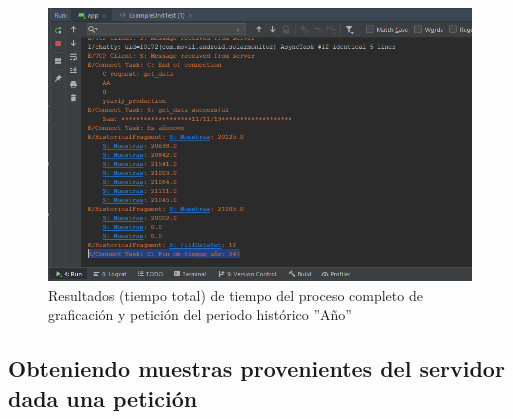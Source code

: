 \begin{figure}[H]
	\centering
	\includegraphics[scale=.6]{Capitulo5/images/TiempoCompletoAno2.png}
	\caption{Resultados (tiempo total) de tiempo del proceso completo de graficación y petición del periodo histórico ''Año''}	\label{fig:TiempoCompletoHAno}
\end{figure} 




\subsection{Obteniendo muestras provenientes del servidor dada una petición}

